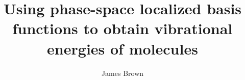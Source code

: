 


%





\title{Using phase-space localized basis functions to obtain vibrational energies of molecules}

\author{James Brown}



\beforepreface



